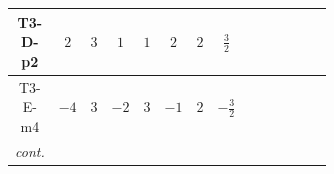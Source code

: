 \documentclass[8pt]{article}
\begin{document}
\begin{landscape}
\begin{longtable}{@{}cccccccc >{\raggedright\arraybackslash}p{0.21\linewidth} >{\raggedright\arraybackslash}p{0.21\linewidth} >{\raggedright\arraybackslash}p{0.21\linewidth}@{}}
T3-D-p2 & $2$ & $3$ & $1$ & $1$ & $2$ & $2$ & $\frac{3}{2}$ & \scriptsize\adjustbox{max width=\linewidth}{$\begin{gathered} -2 \hbar  \log \left(\frac{\bar{\mu}^{2}}{M_F^2}\right) \overline{y_{2,i_1,r_1}} \overline{y_{2,i_2,r_2}} S_2^2 y_{2,i_1,r_2} y_{2,i_2,r_1} \left(S_2{}^{\dagger }\right){}^2 \\ +2 C_{S_2^\dagger S_2} \hbar  \log \left(\frac{\bar{\mu}^{2}}{M_F^2}\right) \overline{y_{2,i_1,r_1}} S_2 y_{2,i_1,r_1} S_2{}^{\dagger } \\ -2 \hbar  \log \left(\frac{\bar{\mu}^{2}}{M_F^2}\right) \overline{y_{2,i_1,r_1}} S_2^2 y_{2,i_1,r_1} \left(S_2{}^{\dagger }\right){}^2 \lambda_{S_2}^{(1)}^{(1)}\end{gathered}$} &  & \scriptsize\adjustbox{max width=\linewidth}{$\begin{gathered} -\frac{9}{2} \hbar  \log \left(\frac{\bar{\mu}^{2}}{M_F^2}\right) B_{\mu _1\mu _2}^2\end{gathered}$} \\
\midrule
T3-E-m4 & $-4$ & $3$ & $-2$ & $3$ & $-1$ & $2$ & $-\frac{3}{2}$ & \scriptsize\adjustbox{max width=\linewidth}{$\begin{gathered} +\frac{2}{3} \hbar  \log \left(\frac{\bar{\mu}^{2}}{M_F^2}\right) \overline{y_{2,i_1,r_1}} \overline{y_{2,i_2,r_2}} S_{2,j_2}^2 y_{2,i_1,r_2} y_{2,i_2,r_1} \left(S_{2,j_1}{}^{\dagger }\right){}^2 \\ +\frac{2 C_{S_2^\dagger S_2} \hbar  \log \left(\frac{\bar{\mu}^{2}}{M_F^2}\right) \overline{y_{2,i_1,r_1}} S_{2,j_1} y_{2,i_1,r_1} S_{2,j_1}{}^{\dagger }}{\sqrt{3}} \\ -\frac{4}{3} \hbar  \log \left(\frac{\bar{\mu}^{2}}{M_F^2}\right) \overline{y_{2,i_1,r_1}} \overline{y_{2,i_2,r_2}} S_{2,j_1} S_{2,j_2} y_{2,i_1,r_2} y_{2,i_2,r_1} S_{2,j_1}{}^{\dagger } S_{2,j_2}{}^{\dagger }\end{gathered}$} &  & \scriptsize\adjustbox{max width=\linewidth}{$\begin{gathered} -\frac{9}{2} \hbar  \log \left(\frac{\bar{\mu}^{2}}{M_F^2}\right) B_{\mu _1\mu _2}^2\end{gathered}$} \\
\textit{cont.} &  &  &  &  &  &  &  & \scriptsize\adjustbox{max width=\linewidth}{$\begin{gathered} -\frac{2 \hbar  \log \left(\frac{\bar{\mu}^{2}}{M_F^2}\right) \overline{y_{2,i_1,r_1}} S_{2,j_3} S_{2,j_4} y_{2,i_1,r_1} S_{2,j_1}{}^{\dagger } S_{2,j_2}{}^{\dagger } \mathcal{I}_{S_2,j_1,j_3,j_2,j_4}{}^1 \lambda_{S_2}^{(1)}^{(1)}}{\sqrt{3}} \\ -\frac{2 \hbar  \log \left(\frac{\bar{\mu}^{2}}{M_F^2}\right) \overline{y_{2,i_1,r_1}} S_{2,j_3} S_{2,j_4} y_{2,i_1,r_1} S_{2,j_1}{}^{\dagger } S_{2,j_2}{}^{\dagger } \mathcal{I}_{S_2,j_1,j_3,j_2,j_4}{}^2 \lambda_{S_2}^{(1)}^{(2)}}{\sqrt{3}}\end{gathered}$} &  &  \\

\end{longtable}
\end{landscape}
\end{document}
